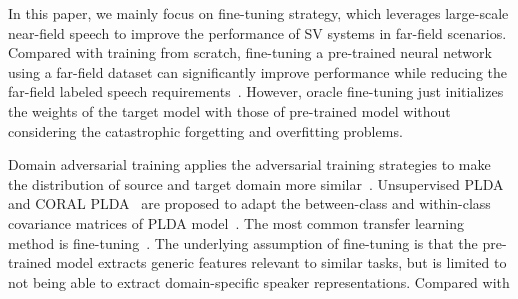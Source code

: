 \documentclass{article}
\begin{document}
In this paper, we mainly focus on fine-tuning strategy, which leverages large-scale near-field speech to improve the performance of SV systems in far-field scenarios. Compared with training from scratch, fine-tuning a pre-trained neural network using a far-field dataset can significantly improve
performance while reducing the far-field labeled speech requirements~\cite{gusev2020stc,zhang2020npu}. However, oracle fine-tuning just initializes
the weights of the target model with those of pre-trained
model without considering the catastrophic forgetting and
overfitting problems. %
\iffalse
\begin{figure}[th]
\captionsetup{font={footnotesize}} 
\centering
\centerline{\texttt{[image: images/finetune\_1.png]}}
\caption{The losses and EER on FFSVC~2020 and FFSVC~2022 during fine-tuning. }
\setlength{\belowdisplayskip}{-1pt}
\label{fig:trendency}
\end{figure}
\fi
\iffalse
Domain adversarial training applies the adversarial training strategies to make the distribution of source and target domain more similar~\cite{wang2018unsupervised,rohdin2019speaker}. Unsupervised PLDA~\cite{garcia2014unsupervised} and CORAL PLDA~\cite{lee2019coral+} are proposed to adapt the between-class
and within-class covariance matrices of PLDA model~\cite{prince2007probabilistic}. The most common transfer learning method is fine-tuning~\cite{tong2020jd,gusev2020stc,zhang2020deep}. The underlying assumption of fine-tuning is that the pre-trained model extracts generic features relevant to similar tasks, but is limited to not being able to extract domain-specific speaker representations. Compared with
\end{document}
